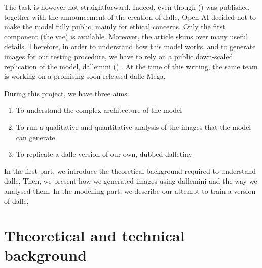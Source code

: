 \documentclass{article}
\begin{document}
\begin{multicols}{2}
The task is however not straightforward. Indeed, even though  (\cite{zeroshot}) was published together with the announcement of the creation of \gls{dalle}, Open-AI decided not to make the model fully public, mainly for ethical concerns. Only the first component (the \gls{vae}) is available. Moreover, the article skims over many useful details. Therefore, in order to understand how this model works, and to generate images for our testing procedure, we have to rely on a public down-scaled replication of the model, \gls{dallemini} (\cite{wandbdallemini, dalleminigit})
. At the time of this writing, the same team is working on a promising soon-released \gls{dalle} Mega.


During this project, we have three aims:
\begin{enumerate}
    \item To understand the complex architecture of the model
    \item To run a qualitative and quantitative analysis of the images that the model can generate
    \item To replicate a \gls{dalle} version of our own, dubbed \gls{dalletiny}
\end{enumerate}

In the first part, we introduce the theoretical background required to understand \gls{dalle}. Then, we present how we generated images using \gls{dallemini}  and the way we analysed them. In the modelling part, we describe our attempt to train a version of \gls{dalle}.


\end{multicols}

\pagebreak

\section{Theoretical and technical background}
\end{document}
